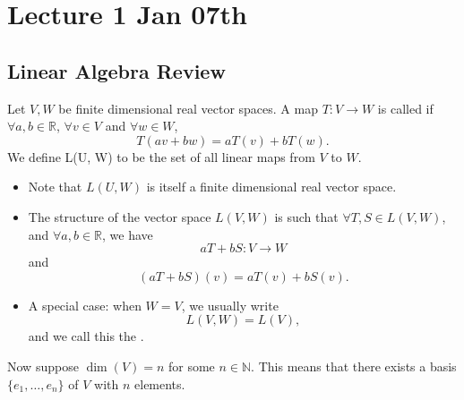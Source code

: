 \documentclass[notoc,notitlepage]{tufte-book}
\begin{document}

\label{part:exterior_differential_calculus}

\chapter{Lecture 1 Jan 07th}%
\label{chp:lecture_1_jan_07th}

\section{Linear Algebra Review}%
\label{sec:linear_algebra_review}

\begin{defn}\label{defn:linear_map}
  Let $V, W$ be finite dimensional real vector spaces. A map $T : V \to W$ is called  if $\forall a, b \in \mathbb{R}$, $\forall v \in V$ and $\forall w \in W$,
  \begin{equation*}
    T(av + bw) = aT(v) + bT(w).
  \end{equation*}
  We define L(U, W) to be the set of all linear maps from $V$ to $W$.
\end{defn}

\begin{note}
  \begin{itemize}
    \item Note that $L(U, W)$ is itself a finite dimensional real vector space.
    \item The structure of the vector space $L(V, W)$ is such that $\forall T, S \in L(V, W)$, and $\forall a, b \in \mathbb{R}$, we have
      \begin{equation*}
        aT + bS : V \to W
      \end{equation*}
      and
      \begin{equation*}
        (aT + bS)(v) = aT(v) + bS(v).
      \end{equation*}
    \item A special case: when $W = V$, we usually write
      \begin{equation*}
        L(V, W) = L(V),
      \end{equation*}
      and we call this the .
  \end{itemize}
\end{note}

Now suppose $\dim(V) = n$ for some $n \in \mathbb{N}$. This means that there exists a basis $\{ e_1 , \ldots, e_n \}$ of $V$ with $n$ elements.
\end{document}

